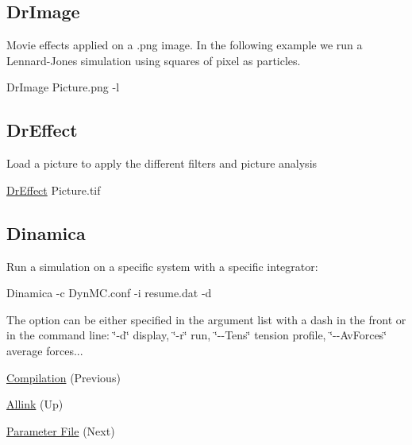 \hypertarget{usage_page_DrImage_section}{}\subsection{Dr\+Image}\label{usage_page_DrImage_section}
Movie effects applied on a .png image. In the following example we run a Lennard-\/\+Jones simulation using squares of pixel as particles. 
\begin{DoxyCode}
DrImage Picture.png -l
\end{DoxyCode}
\hypertarget{usage_page_DrEffect_section}{}\subsection{Dr\+Effect}\label{usage_page_DrEffect_section}
Load a picture to apply the different filters and picture analysis 
\begin{DoxyCode}
\hyperlink{classDrEffect}{DrEffect} Picture.tif
\end{DoxyCode}
\hypertarget{usage_page_Dinamica_section}{}\subsection{Dinamica}\label{usage_page_Dinamica_section}
Run a simulation on a specific system with a specific integrator\+: 
\begin{DoxyCode}
Dinamica -c DynMC.conf -i resume.dat -d 
\end{DoxyCode}
 The option can be either specified in the argument list with a dash in the front or in the command line\+: \char`\"{}-\/d\char`\"{} display, \char`\"{}-\/r\char`\"{} run, \char`\"{}-\/-\/\+Tens\char`\"{} tension profile, \char`\"{}-\/-\/\+Av\+Forces\char`\"{} average forces...


\begin{DoxyItemize}
\item \hyperlink{compile_page}{Compilation} (Previous)  
\item \hyperlink{index}{Allink} (Up)  
\item \hyperlink{param_page}{Parameter File} (Next)  
\end{DoxyItemize}